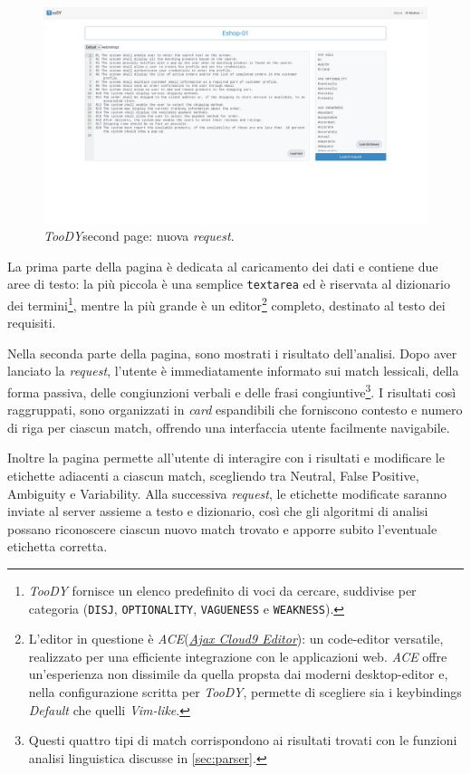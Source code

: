 \documentclass[12pt]{report}
\newcommand{\toody}{\textsl{TooDY}\xspace}
\newcommand{\ace}{\textsl{ACE}\xspace}
\begin{document}
\begin{figure}[H]
\centering
\includegraphics[width=1.0\textwidth]{pagina2-vuota.png}
\caption{\toody \textsf{second page}: nuova \textit{request}.}
\label{fig:pagina1-login}
\end{figure}

La prima parte della pagina è dedicata al caricamento dei dati e contiene due aree di testo: la più piccola è una semplice \texttt{textarea} ed è riservata al dizionario dei termini\footnote{\toody fornisce un elenco predefinito di voci da cercare, suddivise per categoria (\texttt{DISJ}, \texttt{OPTIONALITY}, \texttt{VAGUENESS} e \texttt{WEAKNESS}).}, mentre la più grande è un editor\footnote{L'editor in questione è \ace (\href{https://ace.c9.io/}{\textit{Ajax Cloud9 Editor}}): un code-editor versatile, realizzato per una efficiente integrazione con le applicazioni web. \ace offre un'esperienza non dissimile da quella propsta dai moderni desktop-editor e, nella configurazione scritta per \toody, permette di scegliere sia i keybindings \textsl{Default} che quelli \textsl{Vim-like}.} completo, destinato al testo dei requisiti.

Nella seconda parte della pagina, sono mostrati i risultato dell'analisi. Dopo aver lanciato la \textit{request}, l'utente è immediatamente informato sui match lessicali, della forma passiva, delle congiunzioni verbali e delle frasi congiuntive\footnote{Questi quattro tipi di match corrispondono ai risultati trovati con le funzioni analisi linguistica discusse in \cref{sec:parser}.}. I risultati così raggruppati, sono organizzati in \textit{card} espandibili che forniscono contesto e numero di riga per ciascun match, offrendo una interfaccia utente facilmente navigabile.

Inoltre la pagina permette all'utente di interagire con i risultati e modificare le etichette adiacenti a ciascun match, scegliendo tra \textsf{Neutral}, \textsf{False Positive}, \textsf{Ambiguity} e \textsf{Variability}. Alla successiva \textit{request}, le etichette modificate saranno inviate al server assieme a testo e dizionario, così che gli algoritmi di analisi possano riconoscere ciascun nuovo match trovato e apporre subito l'eventuale etichetta corretta.
\end{document}
